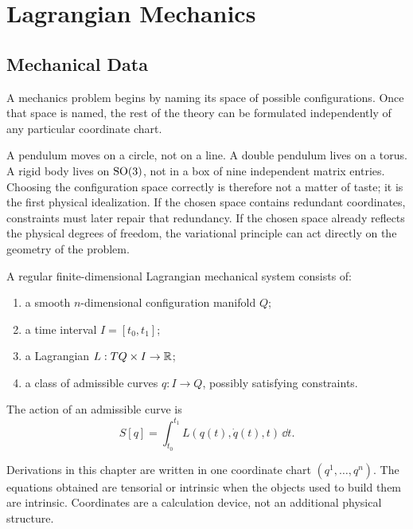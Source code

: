 \chapter{Lagrangian Mechanics}
\label{chap:lagrangian}

\section{Mechanical Data}
\label{sec:lagrangian-mechanical-data}

A mechanics problem begins by naming its space of possible configurations. Once
that space is named, the rest of the theory can be formulated independently of
any particular coordinate chart.

A pendulum moves on a circle, not on a line. A double pendulum lives on a
torus. A rigid body lives on \(\operatorname{SO}(3)\), not in a box of nine independent
matrix entries. Choosing the configuration space correctly is therefore not a
matter of taste; it is the first physical idealization. If the chosen space
contains redundant coordinates, constraints must later repair that redundancy.
If the chosen space already reflects the physical degrees of freedom, the
variational principle can act directly on the geometry of the problem.

\begin{definition}
A regular finite-dimensional Lagrangian mechanical system consists of:
\begin{enumerate}
\item a smooth \(n\)-dimensional configuration manifold \(Q\);
\item a time interval \(I=[t_0,t_1]\);
\item a Lagrangian \(L:TQ\times I\to \mathbb{R}\);
\item a class of admissible curves \(q:I\to Q\), possibly satisfying constraints.
\end{enumerate}
The action of an admissible curve is
\[
  S[q]=\int_{t_0}^{t_1} L(q(t),\dot q(t),t)\,\dd t.
\]
\end{definition}

\begin{setting}
Derivations in this chapter are written in one coordinate chart
\((q^1,\ldots,q^n)\). The equations obtained are tensorial or intrinsic when
the objects used to build them are intrinsic. Coordinates are a calculation
device, not an additional physical structure.
\end{setting}

